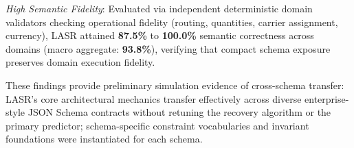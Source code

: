 \textit{High Semantic Fidelity}: Evaluated via independent deterministic domain validators checking operational fidelity (routing, quantities, carrier assignment, currency), LASR attained \textbf{87.5\%} to \textbf{100.0\%} semantic correctness across domains (macro aggregate: \textbf{93.8\%}), verifying that compact schema exposure preserves domain execution fidelity.

These findings provide preliminary simulation evidence of cross-schema transfer: LASR's core architectural mechanics transfer effectively across diverse enterprise-style JSON Schema contracts without retuning the recovery algorithm or the primary predictor; schema-specific constraint vocabularies and invariant foundations were instantiated for each schema.
